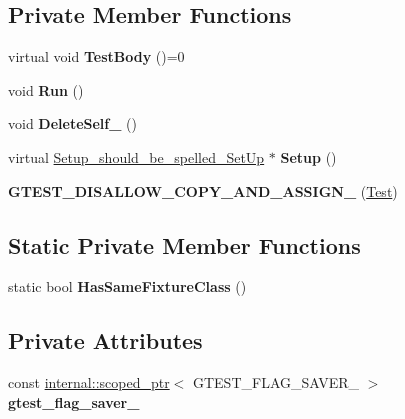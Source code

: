 \subsection*{Private Member Functions}
\begin{DoxyCompactItemize}
\item 
\mbox{\label{classtesting_1_1_test_a146a4a5d9854e676d625a0ef67409794}} 
virtual void {\bfseries Test\+Body} ()=0
\item 
\mbox{\label{classtesting_1_1_test_a939ae280a6f2f1c3d43708ec616684ed}} 
void {\bfseries Run} ()
\item 
\mbox{\label{classtesting_1_1_test_a3116f1f98ac889b11f1e3d981b8c6ca1}} 
void {\bfseries Delete\+Self\+\_\+} ()
\item 
\mbox{\label{classtesting_1_1_test_a65c1626d50b7dd1a1d759dc6c3f72d4c}} 
virtual \hyperlink{structtesting_1_1_test_1_1_setup__should__be__spelled___set_up}{Setup\+\_\+should\+\_\+be\+\_\+spelled\+\_\+\+Set\+Up} $\ast$ {\bfseries Setup} ()
\item 
\mbox{\label{classtesting_1_1_test_a5d18da7437b0d6ca32dcad90a21f9b6b}} 
{\bfseries G\+T\+E\+S\+T\+\_\+\+D\+I\+S\+A\+L\+L\+O\+W\+\_\+\+C\+O\+P\+Y\+\_\+\+A\+N\+D\+\_\+\+A\+S\+S\+I\+G\+N\+\_\+} (\hyperlink{classtesting_1_1_test}{Test})
\end{DoxyCompactItemize}
\subsection*{Static Private Member Functions}
\begin{DoxyCompactItemize}
\item 
\mbox{\label{classtesting_1_1_test_a2d621c1300d3e850bcf1de70b57eb488}} 
static bool {\bfseries Has\+Same\+Fixture\+Class} ()
\end{DoxyCompactItemize}
\subsection*{Private Attributes}
\begin{DoxyCompactItemize}
\item 
\mbox{\label{classtesting_1_1_test_a132c542f6932107234988d05a9980e49}} 
const \hyperlink{classtesting_1_1internal_1_1scoped__ptr}{internal\+::scoped\+\_\+ptr}$<$ G\+T\+E\+S\+T\+\_\+\+F\+L\+A\+G\+\_\+\+S\+A\+V\+E\+R\+\_\+ $>$ {\bfseries gtest\+\_\+flag\+\_\+saver\+\_\+}
\end{DoxyCompactItemize}
